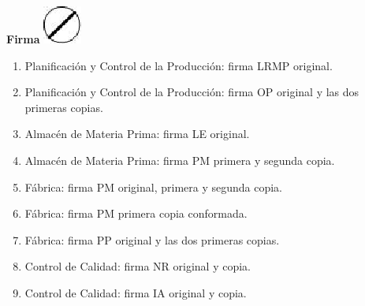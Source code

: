 \begin{center}
  \textbf{Firma}
  \includegraphics{./Images/Simbolos/simbolo-Firma.png}
\end{center}
\begin{enumerate}
  \item Planificaci\'on y Control de la Producci\'on: firma LRMP original.
  \item Planificaci\'on y Control de la Producci\'on: firma OP original y las dos primeras copias.
  \item Almac\'en de Materia Prima: firma LE original.
  \item Almac\'en de Materia Prima: firma PM primera y segunda copia.
  \item F\'abrica: firma PM original, primera y segunda copia.
  \item F\'abrica: firma PM primera copia conformada.
  \item F\'abrica: firma PP original y las dos primeras copias.
  \item Control de Calidad: firma NR original y copia.
  \item Control de Calidad: firma IA original y copia.
\end{enumerate}


